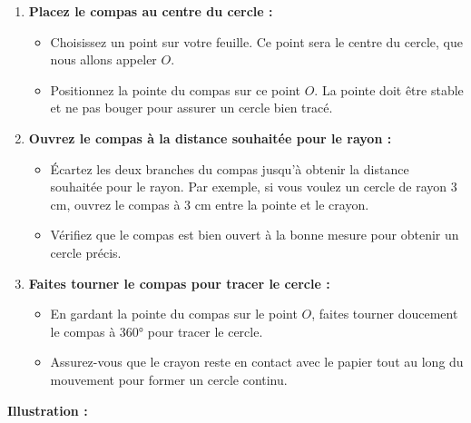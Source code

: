 \documentclass{article}
\begin{document}
\begin{enumerate}
    \item \textbf{Placez le compas au centre du cercle :}
    \begin{itemize}
        \item Choisissez un point sur votre feuille. Ce point sera le centre du cercle, que nous allons appeler \(O\).
        \item Positionnez la pointe du compas sur ce point \(O\). La pointe doit être stable et ne pas bouger pour assurer un cercle bien tracé.
    \end{itemize}

    \item \textbf{Ouvrez le compas à la distance souhaitée pour le rayon :}
    \begin{itemize}
        \item Écartez les deux branches du compas jusqu'à obtenir la distance souhaitée pour le rayon. Par exemple, si vous voulez un cercle de rayon 3 cm, ouvrez le compas à 3 cm entre la pointe et le crayon.
        \item Vérifiez que le compas est bien ouvert à la bonne mesure pour obtenir un cercle précis.
    \end{itemize}

    \item \textbf{Faites tourner le compas pour tracer le cercle :}
    \begin{itemize}
        \item En gardant la pointe du compas sur le point \(O\), faites tourner doucement le compas à 360° pour tracer le cercle.
        \item Assurez-vous que le crayon reste en contact avec le papier tout au long du mouvement pour former un cercle continu.
    \end{itemize}
\end{enumerate}

\textbf{Illustration :}
\begin{tcolorbox}[colback=blue!10!white, colframe=blue!75!black, title=\textcolor{white}{Illustration}, sharp corners=south]
    \begin{center}
    \end{center}
\end{tcolorbox}
\end{document}
